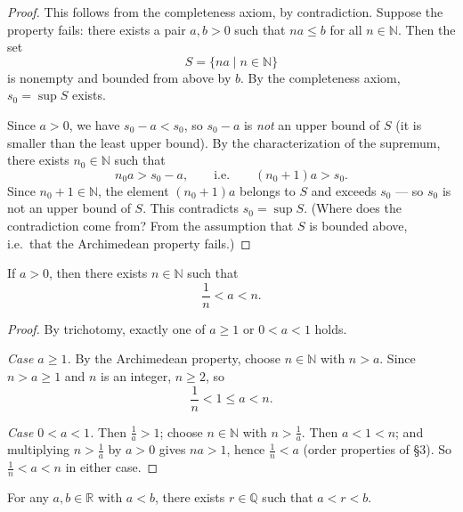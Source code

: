 \documentclass[11pt]{report}
\begin{document}
\begin{proof}
This follows from the completeness axiom, by contradiction. Suppose the property fails: there exists a pair $a, b > 0$ such that $na \leq b$ for all $n \in \mathbb{N}$. Then the set
\[
S = \{na \mid n \in \mathbb{N}\}
\]
is nonempty and bounded from above by $b$. By the completeness axiom, $s_0 = \sup S$ exists.

Since $a > 0$, we have $s_0 - a < s_0$, so $s_0 - a$ is \emph{not} an upper bound of $S$ (it is smaller than the least upper bound). By the characterization of the supremum, there exists $n_0 \in \mathbb{N}$ such that
\[
n_0 a > s_0 - a, \qquad \text{i.e.} \qquad (n_0 + 1)a > s_0.
\]
Since $n_0 + 1 \in \mathbb{N}$, the element $(n_0+1)a$ belongs to $S$ and exceeds $s_0$ --- so $s_0$ is not an upper bound of $S$. This contradicts $s_0 = \sup S$. (Where does the contradiction come from? From the assumption that $S$ is bounded above, i.e.\ that the Archimedean property fails.)
\end{proof}

\begin{propbox}
If $a > 0$, then there exists $n \in \mathbb{N}$ such that
\[
\frac1n < a < n.
\]
\end{propbox}

\begin{proof}
By trichotomy, exactly one of $a \geq 1$ or $0 < a < 1$ holds.

\emph{Case $a \geq 1$.} By the Archimedean property, choose $n \in \mathbb{N}$ with $n > a$. Since $n > a \geq 1$ and $n$ is an integer, $n \geq 2$, so
\[
\frac1n < 1 \leq a < n.
\]

\emph{Case $0 < a < 1$.} Then $\tfrac1a > 1$; choose $n \in \mathbb{N}$ with $n > \tfrac1a$. Then $a < 1 < n$; and multiplying $n > \tfrac1a$ by $a > 0$ gives $na > 1$, hence $\tfrac1n < a$ (order properties of \S 3). So $\tfrac1n < a < n$ in either case.
\end{proof}

\begin{thmbox}
For any $a, b \in \mathbb{R}$ with $a < b$, there exists $r \in \mathbb{Q}$ such that $a < r < b$.
\end{thmbox}
\end{document}
